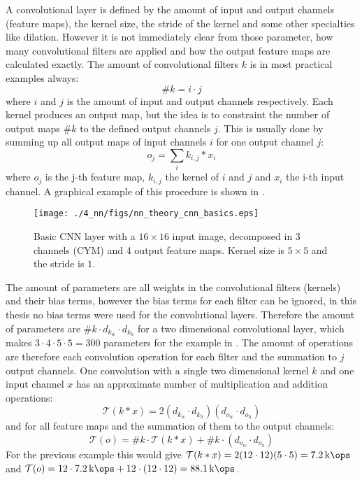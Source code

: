A convolutional layer is defined by the amount of input and output channels (feature maps), the kernel size, the stride of the kernel and some other specialties like dilation.
However it is not immediately clear from those parameter, how many convolutional filters are applied and how the output feature maps are calculated exactly.
The amount of convolutional filters $k$ is in most practical examples always:
\begin{equation}\label{eq:nn_theory_n_filters}
  \#k = i \cdot j
\end{equation}
where $i$ and $j$ is the amount of input and output channels respectively.
Each kernel produces an output map, but the idea is to constraint the number of output maps $\#k$ to the defined output channels $j$.
This is usually done by summing up all output maps of input channels $i$ for one output channel $j$:
\begin{equation}
  o_j = \sum_{i} k_{i, j} * x_i
\end{equation}
where $o_j$ is the j-th feature map, $k_{i, j}$ the kernel of $i$ and $j$ and $x_i$ the i-th input channel.
A graphical example of this procedure is shown in .
\begin{figure}[!ht]
  \centering
    \texttt{[image: ./4\_nn/figs/nn\_theory\_cnn\_basics.eps]}
  \caption{Basic CNN layer with a $16 \times 16$ input image, decomposed in 3 channels (CYM) and 4 output feature maps. Kernel size is $5 \times 5$ and the stride is $1$.}
  \label{fig:nn_theory_cnn_basics}
\end{figure}
\FloatBarrier
\noindent

The amount of parameters are all weights in the convolutional filters (kernels) and their bias terms, however the bias terms for each filter can be ignored, in this thesis no bias terms were used for the convolutional layers.
Therefore the amount of parameters are $\#k \cdot d_{k_w} \cdot d_{k_h}$ for a two dimensional convolutional layer, which makes $3 \cdot 4 \cdot 5 \cdot 5 = 300$ parameters for the example in .
The amount of operations are therefore each convolution operation for each filter and the summation to $j$ output channels.
One convolution with a single two dimensional kernel $k$ and one input channel $x$ has an approximate number of multiplication and addition operations:
\begin{equation}
  \mathcal{T}(k * x) = 2(d_{k_w} \cdot d_{k_h}) (d_{o_w} \cdot d_{o_h})
\end{equation}
and for all feature maps and the summation of them to the output channels:
\begin{equation}
  \mathcal{T}(o) = \#k \cdot \mathcal{T}(k * x) + \#k \cdot (d_{o_w} \cdot d_{o_h})
\end{equation}
For the previous example this would give $\mathcal{T}(k * x) = 2 (12 \cdot 12) (5 \cdot 5) = \SI{7.2}{\kilo\ops}$ and $\mathcal{T}(o) = 12 \cdot \SI{7.2}{\kilo\ops} + 12 \cdot (12 \cdot 12) = \SI{88.1}{\kilo\ops}$.


